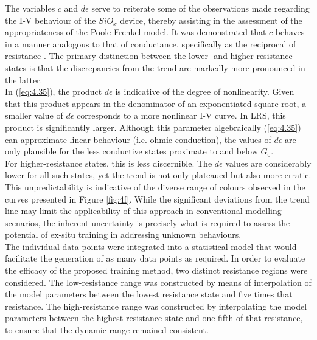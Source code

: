 \noindent The variables $c$ and $d\epsilon$ serve to reiterate some of the observations made regarding the I-V behaviour of the $SiO_x$ device, thereby assisting in the assessment of the appropriateness of the Poole-Frenkel model. It was demonstrated that $c$ behaves in a manner analogous to that of conductance, specifically as the reciprocal of resistance \cite{joksas2022memristive}. The primary distinction between the lower- and higher-resistance states is that the discrepancies from the trend are markedly more pronounced in the latter. \\

\noindent In (\ref{eq:4.35}), the product $d\epsilon$ is indicative of the degree of nonlinearity. Given that this product appears in the denominator of an exponentiated square root, a smaller value of $d\epsilon$ corresponds to a more nonlinear I-V curve. In LRS, this product is significantly larger. Although this parameter algebraically (\ref{eq:4.35}) can approximate linear behaviour (i.e. ohmic conduction), the values of $d\epsilon$ are only plausible for the less conductive states proximate to and below $G_0$. \\

\noindent For higher-resistance states, this is less discernible. The $d\epsilon$ values are considerably lower for all such states, yet the trend is not only plateaued but also more erratic. This unpredictability is indicative of the diverse range of colours observed in the curves presented in Figure \ref{fig:4f}. While the significant deviations from the trend line may limit the applicability of this approach in conventional modelling scenarios, the inherent uncertainty is precisely what is required to assess the potential of ex-situ training in addressing unknown behaviours. \\

\noindent The individual data points were integrated into a statistical model that would facilitate the generation of as many data points as required. In order to evaluate the efficacy of the proposed training method, two distinct resistance regions were considered. The low-resistance range was constructed by means of interpolation of the model parameters between the lowest resistance state and five times that resistance. The high-resistance range was constructed by interpolating the model parameters between the highest resistance state and one-fifth of that resistance, to ensure that the dynamic range remained consistent. \\

